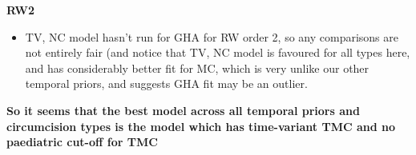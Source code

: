 \documentclass{article}
\begin{document}
\textbf{RW2}
\begin{itemize}
    \item TV, NC model hasn't run for GHA for RW order 2, so any comparisons are not entirely fair (and notice that TV, NC model is favoured for all types here, and has considerably better fit for MC, which is very unlike our other temporal priors, and suggests GHA fit may be an outlier. 
\end{itemize}

\vspace{\bigskipamount}
    
\textbf{So it seems that the best model across all temporal priors and circumcision types is the model which has time-variant TMC and no paediatric cut-off for TMC}

\vspace{\bigskipamount}
\end{document}

